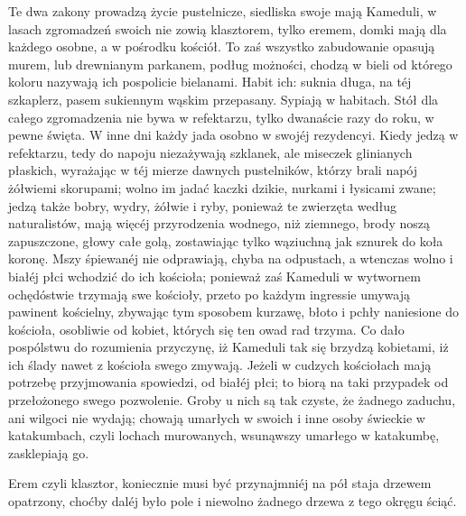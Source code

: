\documentclass{book}
\begin{document}
Te dwa zakony prowadzą życie pustelnicze, siedliska swoje mają Kameduli, w lasach zgromadzeń swoich nie zowią klasztorem, tylko eremem, domki mają dla każdego osobne, a w pośrodku kościół. To zaś wszystko zabudowanie opasują murem, lub drewnianym parkanem, podług możności, chodzą w bieli od którego koloru nazywają ich pospolicie bielanami. Habit ich: suknia długa, na téj szkaplerz, pasem sukiennym wąskim przepasany. Sypiają w habitach. Stół dla całego zgromadzenia nie bywa w refektarzu, tylko dwanaście razy do roku, w pewne święta. W inne dni każdy jada osobno w swojéj rezydencyi. Kiedy jedzą w refektarzu, tedy do napoju niezażywają szklanek, ale miseczek glinianych płaskich, wyrażając w téj mierze dawnych pustelników, którzy brali napój żółwiemi skorupami; wolno im jadać kaczki dzikie, nurkami i łysicami zwane; jedzą także bobry, wydry, żółwie i ryby, ponieważ te zwierzęta według naturalistów, mają więcéj przyrodzenia wodnego, niż ziemnego, brody noszą zapuszczone, głowy całe golą, zostawiając tylko wąziuchną jak sznurek do koła koronę. Mszy śpiewanéj nie odprawiają, chyba na odpustach, a wtenczas wolno i białéj płci wchodzić do ich kościoła; ponieważ zaś Kameduli w wytwornem ochędóstwie trzymają swe kościoły, przeto po każdym ingressie umywają pawinent kościelny, zbywając tym sposobem kurzawę, błoto i pchły naniesione do kościoła, osobliwie od kobiet, których się ten owad rad trzyma. Co dało pospólstwu do rozumienia przyczynę, iż Kameduli tak się brzydzą kobietami, iż ich ślady nawet z kościoła swego zmywają. Jeżeli w cudzych kościołach mają potrzebę przyjmowania spowiedzi, od białéj płci; to biorą na taki przypadek od przełożonego swego pozwolenie. Groby u nich są tak czyste, że żadnego zaduchu, ani wilgoci nie wydają; chowają umarłych w swoich i inne osoby świeckie w katakumbach, czyli lochach murowanych, wsunąwszy umarłego w katakumbę, zasklepiają go.

Erem czyli klasztor, koniecznie musi być przynajmniéj na pół staja drzewem opatrzony, choćby daléj było pole i niewolno żadnego drzewa z tego okręgu ściąć.
\end{document}
